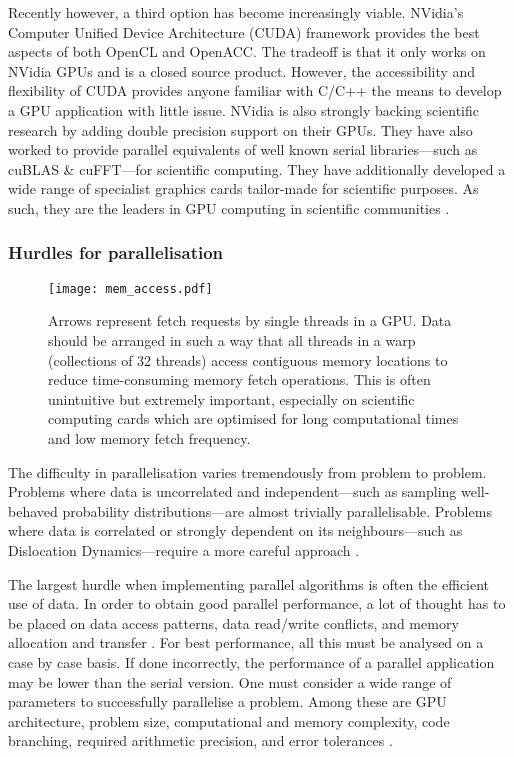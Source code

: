 Recently however, a third option has become increasingly viable. NVidia's Computer Unified Device Architecture (CUDA) framework provides the best aspects of both OpenCL and OpenACC. The tradeoff is that it only works on NVidia GPUs and is a closed source product. However, the accessibility and flexibility of CUDA provides anyone familiar with C/C++ the means to develop a GPU application with little issue. NVidia is also strongly backing scientific research by adding double precision support on their GPUs. They have also worked to provide parallel equivalents of well known serial libraries---such as cuBLAS \& cuFFT---for scientific computing. They have additionally developed a wide range of specialist graphics cards tailor-made for scientific purposes. As such, they are the leaders in GPU computing in scientific communities \cite{nvidia}.

\subsubsection{Hurdles for parallelisation}
\begin{figure}[t]
    \centering
    \texttt{[image: mem\_access.pdf]}
    \caption[Memory access pattern example.]{Arrows represent fetch requests by single threads in a GPU. Data should be arranged in such a way that all threads in a warp (collections of 32 threads) access contiguous memory locations to reduce time-consuming memory fetch operations. This is often unintuitive but extremely important, especially on scientific computing cards which are optimised for long computational times and low memory fetch frequency.}
    \label{f:mem_access}
\end{figure}

The difficulty in parallelisation varies tremendously from problem to problem. Problems where data is uncorrelated and independent---such as sampling well-behaved probability distributions---are almost trivially parallelisable. Problems where data is correlated or strongly dependent on its neighbours---such as Dislocation Dynamics---require a more careful approach \cite{parallel_algs}.

The largest hurdle when implementing parallel algorithms is often the efficient use of data. In order to obtain good parallel performance, a lot of thought has to be placed on data access patterns, data read/write conflicts, and memory allocation and transfer \cite{nvidia}. For best performance, all this must be analysed on a case by case basis. If done incorrectly, the performance of a parallel application may be lower than the serial version. One must consider a wide range of parameters to successfully parallelise a problem. Among these are GPU architecture, problem size, computational and memory complexity, code branching, required arithmetic precision, and error tolerances \cite{nvidia, gpu_rev}.

